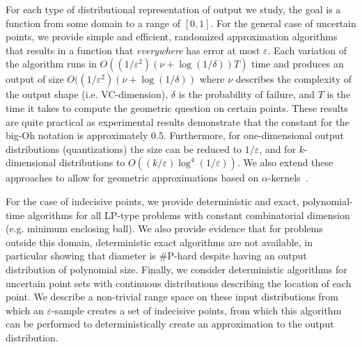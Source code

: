 \documentclass{journal}
\newcommand{\eps}{\varepsilon}
\begin{document}
For each type of distributional representation of output we study, the goal is a function from some domain to a range of $[0,1]$.  
For the general case of uncertain points, we provide simple and efficient, randomized approximation algorithms that results in a function that \emph{everywhere} has error at most $\eps$.  Each variation of the algorithm runs in $O((1/\eps^2)(\nu + \log (1/\delta)) T)$ time and produces an output of size $O((1/\eps^2)(\nu + \log (1/\delta))$ where $\nu$ describes the complexity of the output shape (i.e. VC-dimension), $\delta$ is the probability of failure, and $T$ is the time it takes to compute the geometric question on certain points.  These results are quite practical as experimental results demonstrate that the constant for the big-Oh notation is approximately $0.5$.  Furthermore, for one-dimensional output distributions (quantizations) the size can be reduced to $1/\eps$, and for $k$-dimensional distributions to $O((k/\eps) \log^4 (1/\eps))$.  
We also extend these approaches to allow for geometric approximations based on $\alpha$-kernels~\cite{AHV04,AHV07}.  

For the case of indecisive points, we provide deterministic and exact, polynomial-time algorithms for all LP-type problems with constant combinatorial dimension (e.g. minimum enclosing ball).  We also provide evidence that for problems outside this domain, deterministic exact algorithms are not available, in particular showing that diameter is \#P-hard despite having an output distribution of polynomial size.  
Finally, we consider deterministic algorithms for uncertain point sets with continuous distributions describing the location of each point.  We describe a non-trivial range space on these input distributions from which an $\eps$-sample creates a set of indecisive points, from which this algorithm can be performed to deterministically create an approximation to the output distribution.  
\end{document}

